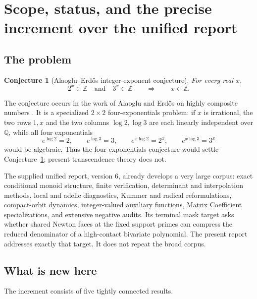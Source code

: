 \documentclass[11pt,oneside]{article}
\newtheorem{conjecture}[theorem]{Conjecture}
\theoremstyle{definition}
\theoremstyle{remark}
\newcommand{\Z}{\mathbb Z}
\newcommand{\Q}{\mathbb Q}
\newcommand{\AEname}{Alaoglu--Erd\H{o}s}
\begin{document}
\tableofcontents
\clearpage
{}

\section{Scope, status, and the precise increment over the unified report}
\label{sec:scope}

\subsection{The problem}

\begin{conjecture}[\AEname{} integer-exponent conjecture]
\label{conj:AE}
For every real $x$,
\[
 2^x\in\Z\quad\text{and}\quad 3^x\in\Z
 \qquad\Longrightarrow\qquad x\in\Z.
\]
\end{conjecture}

The conjecture occurs in the work of Alaoglu and Erd\H{o}s on highly composite numbers
\cite{AE1944}.  It is a specialized $2\times2$ four-exponentials problem: if $x$ is
irrational, the two rows $1,x$ and the two columns $\log2,\log3$ are each linearly independent
over $\Q$, while all four exponentials
\[
 e^{\log2}=2,\qquad e^{\log3}=3,\qquad
 e^{x\log2}=2^x,\qquad e^{x\log3}=3^x
\]
would be algebraic.  Thus the four exponentials conjecture would settle
Conjecture~\ref{conj:AE}; present transcendence theory does not.

The supplied unified report, version 6, already develops a very large corpus: exact
conditional monoid structure, finite verification, determinant and interpolation methods,
local and adelic diagnostics, Kummer and radical reformulations, compact-orbit dynamics,
integer-valued auxiliary functions, Matrix Coefficient specializations, and extensive
negative audits.  Its terminal mask target asks whether shared Newton faces at the fixed
support primes can compress the reduced denominator of a high-contact bivariate polynomial.
The present report addresses exactly that target.  It does not repeat the broad corpus.

\subsection{What is new here}

The increment consists of five tightly connected results.
\end{document}
